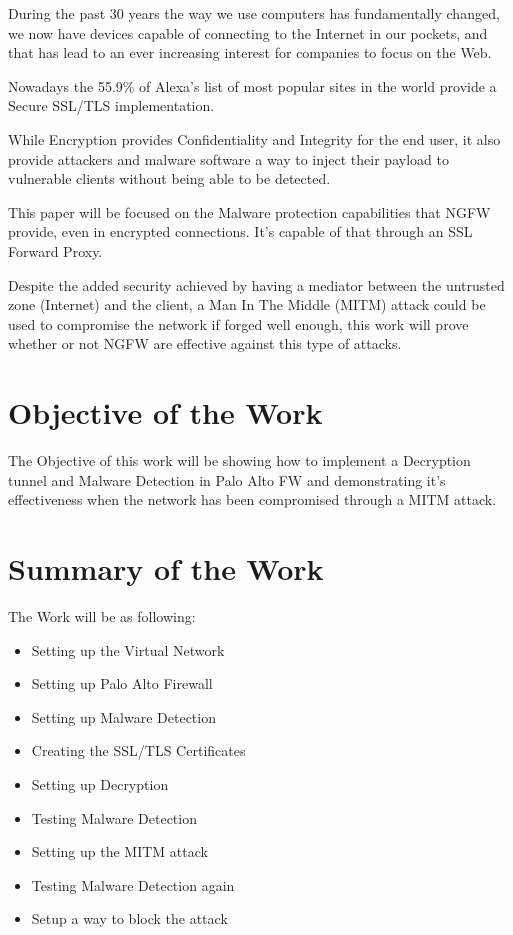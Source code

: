 \documentclass[status=normal,cover=tesi,language=en]{gmeepd}
\begin{document}
During the past 30 years the way we use computers has fundamentally changed, we now have devices capable of connecting to the Internet in our pockets, and that has lead to an ever increasing interest for companies to focus on the Web.

Nowadays the 55.9\% of Alexa's list of most popular sites in the world provide a Secure SSL/TLS implementation\cite{ssl-pulse}.

While Encryption provides Confidentiality and Integrity\cite{ibm-ssl} for the end user, it also provide attackers and malware software a way to inject their payload to vulnerable clients without being able to be detected.

This paper will be focused on the Malware protection capabilities that NGFW provide, even in encrypted connections. It's capable of that through an SSL Forward Proxy.

Despite the added security achieved by having a mediator between the untrusted zone (Internet) and the client, a Man In The Middle (MITM) attack could be used to compromise the network if forged well enough, this work will prove whether or not NGFW are effective against this type of attacks.


\section{Objective of the Work}

The Objective of this work will be showing how to implement a Decryption tunnel and Malware Detection in Palo Alto FW and demonstrating it's effectiveness when the network has been compromised through a MITM attack.


\section{Summary of the Work}

The Work will be as following:

\begin{itemize}
    \item Setting up the Virtual Network
    \item Setting up Palo Alto Firewall
    \item Setting up Malware Detection
    \item Creating the SSL/TLS Certificates
    \item Setting up Decryption
    \item Testing Malware Detection
    \item Setting up the MITM attack
    \item Testing Malware Detection again
    \item Setup a way to block the attack
\end{itemize}
\end{document}
